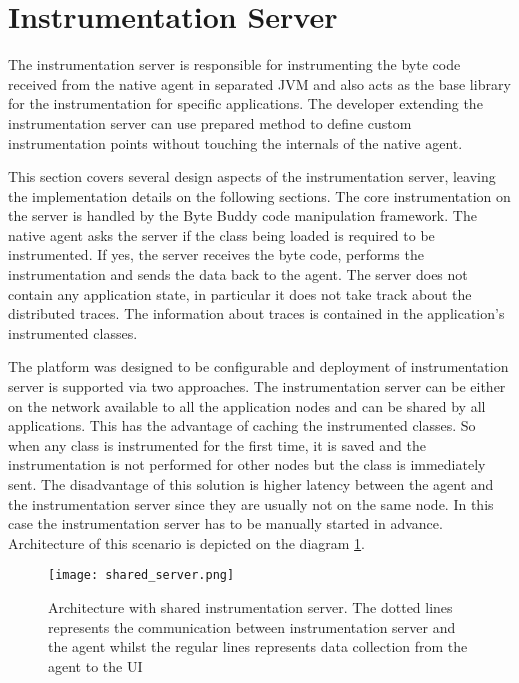 \section{Instrumentation Server}
\label{sec:inst_server}
The instrumentation server is responsible for instrumenting the byte code received from the native agent in separated JVM and also acts as the base library for the instrumentation for specific applications. The developer extending the instrumentation server can use prepared method to define custom instrumentation points without touching the internals of the native agent.

This section covers several design aspects of the instrumentation server, leaving the implementation details on the following sections. The core instrumentation on the server is handled by the Byte Buddy code manipulation framework. The native agent asks the server if the class being loaded is required to be instrumented. If yes, the server receives the byte code, performs the instrumentation and sends the data back to the agent. The server does not contain any application state, in particular it does not take track about the distributed traces. The information about traces is contained in the application's instrumented classes.

The platform was designed to be configurable and deployment of instrumentation server is supported via two approaches. The instrumentation server can be either on the network available to all the application nodes and can be shared by all applications. This has the advantage of caching the instrumented classes. So when any class is instrumented for the first time, it is saved and the instrumentation is not performed for other nodes but the class is immediately sent. The disadvantage of this solution is higher latency between the agent and the instrumentation server since they are usually not on the same node. In this case the instrumentation server has to be manually started in advance. Architecture of this scenario is depicted on the diagram \ref{fig:shared_server}.
 
 \begin{figure}
 	\centering
 	\texttt{[image: shared\_server.png]}
 	\caption{Architecture with shared instrumentation server. The dotted lines represents the communication between instrumentation server and the agent whilst the regular lines represents data collection from the agent to the UI}
 	\label{fig:shared_server}
 \end{figure}
 
